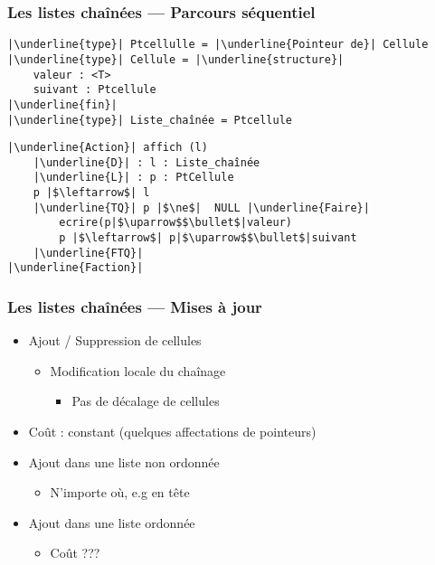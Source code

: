\documentclass[table,handout,tikz,12pt,svgnames]{beamer}
\begin{document}
\begin{frame}[fragile=singleslide]
	\frametitle{Les listes chaînées --- Parcours séquentiel}
	\vspace{-0.7cm}
	\begin{block}{} %
		\begin{verbatim}
|\underline{type}| Ptcellulle = |\underline{Pointeur de}| Cellule
|\underline{type}| Cellule = |\underline{structure}|
	valeur : <T>
	suivant : Ptcellule
|\underline{fin}|
|\underline{type}| Liste_chaînée = Ptcellule
		\end{verbatim}
		\begin{verbatim}
|\underline{Action}| affich (l)
	|\underline{D}| : l : Liste_chaînée 
	|\underline{L}| : p : PtCellule
	p |$\leftarrow$| l
	|\underline{TQ}| p |$\ne$|  NULL |\underline{Faire}| 
		ecrire(p|$\uparrow$$\bullet$|valeur)
		p |$\leftarrow$| p|$\uparrow$$\bullet$|suivant
	|\underline{FTQ}|
|\underline{Faction}|
		\end{verbatim}
	\end{block}
\end{frame}


\begin{frame}[fragile=singleslide]
	\frametitle{Les listes chaînées --- Mises à jour}
	\vspace{-2cm}
	\begin{itemize}
		\item Ajout / Suppression de cellules
		\begin{itemize}
			\item Modification locale du chaînage
			\begin{itemize}
				\item Pas de décalage de cellules
			\end{itemize}
		\end{itemize}
		\item Coût : constant \small(quelques affectations de pointeurs)
		\item Ajout dans une liste non ordonnée
		\begin{itemize}
			\item N'importe où, e.g en tête
		\end{itemize}
		\item Ajout dans une liste ordonnée
		\begin{itemize}
			\item Coût ???
		\end{itemize}
		
	\end{itemize}
\end{frame}
\end{document}
